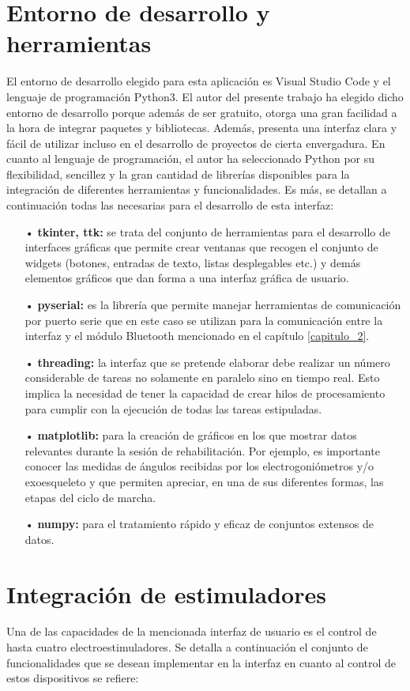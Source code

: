 \section{Entorno de desarrollo y herramientas}
El entorno de desarrollo elegido para esta aplicación es Visual Studio Code y el lenguaje de programación Python3. El autor del presente trabajo ha elegido dicho entorno de desarrollo porque además de ser gratuito, otorga una gran facilidad a la hora de integrar paquetes y bibliotecas. Además,  presenta una interfaz clara y fácil de utilizar incluso en el desarrollo de proyectos de cierta envergadura. En cuanto al lenguaje de programación, el autor ha seleccionado Python por su flexibilidad, sencillez y la gran cantidad de librerías disponibles para la integración de diferentes herramientas y funcionalidades. Es más, se detallan a continuación todas las necesarias para el desarrollo de esta interfaz:
\begin{itemize}
\item[•] \textbf{tkinter, ttk:} se trata del conjunto de herramientas para el desarrollo de interfaces gráficas que permite crear ventanas que recogen el conjunto de widgets (botones, entradas de texto, listas desplegables etc.) y demás elementos gráficos que dan forma a una interfaz gráfica de usuario.
\item[•] \textbf{pyserial:} es la librería que permite manejar herramientas de comunicación por puerto serie que en este caso se utilizan para la comunicación entre la interfaz y el módulo Bluetooth mencionado en el capítulo \ref{capitulo_2}.
\item[•] \textbf{threading:} la interfaz que se pretende elaborar debe realizar un número considerable de tareas no solamente en paralelo sino en tiempo real. Esto implica la necesidad de tener la capacidad de crear hilos de procesamiento para cumplir con la ejecución de todas las tareas estipuladas.
\item[•] \textbf{matplotlib:} para la creación de gráficos en los que mostrar datos relevantes durante la sesión de rehabilitación. Por ejemplo, es importante conocer las medidas de ángulos recibidas por los electrogoniómetros y/o exoesqueleto y que permiten apreciar, en una de sus diferentes formas, las etapas del ciclo de marcha.
\item[•] \textbf{numpy:} para el tratamiento rápido y eficaz de conjuntos extensos de datos.
\end{itemize}



\section{Integración de estimuladores}
Una de las capacidades de la mencionada interfaz de usuario es el control de hasta cuatro electroestimuladores. Se detalla a continuación el conjunto de funcionalidades que se desean implementar en la interfaz en cuanto al control de estos dispositivos se refiere:

